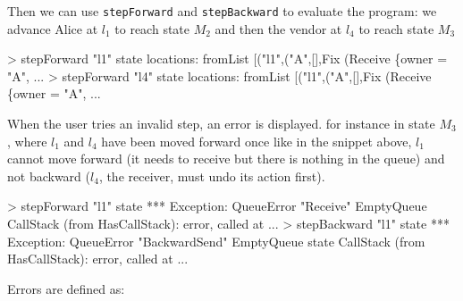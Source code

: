 \documentclass[runningheads,plain]{llncs}
\newenvironment{Shaded}{}{}
\newcommand{\DataTypeTok}[1]{\textcolor[rgb]{0.56,0.13,0.00}{#1}}
\newcommand{\StringTok}[1]{\textcolor[rgb]{0.25,0.44,0.63}{#1}}
\newcommand{\FunctionTok}[1]{\textcolor[rgb]{0.02,0.16,0.49}{#1}}
\newcommand{\NormalTok}[1]{#1}
\begin{document}
Then we can use \texttt{stepForward} and \texttt{stepBackward} to
evaluate the program: we advance Alice at $l_1$ to reach state $M_2$ and then the vendor at $l_4$ to reach state $M_3$

\begin{Shaded}
\begin{Highlighting}[]
\FunctionTok{>}\NormalTok{ stepForward }\StringTok{"l1"}\NormalTok{ state}
\NormalTok{locations}\FunctionTok{:}\NormalTok{ fromList [(}\StringTok{"l1"}\NormalTok{,(}\StringTok{"A"}\NormalTok{,[],}\DataTypeTok{Fix}\NormalTok{ (}\DataTypeTok{Receive}\NormalTok{ \{owner }\FunctionTok{=} \StringTok{"A"}\NormalTok{, }\FunctionTok{...} 
\FunctionTok{>}\NormalTok{ stepForward }\StringTok{"l4"}\NormalTok{ state }
\NormalTok{locations}\FunctionTok{:}\NormalTok{ fromList [(}\StringTok{"l1"}\NormalTok{,(}\StringTok{"A"}\NormalTok{,[],}\DataTypeTok{Fix}\NormalTok{ (}\DataTypeTok{Receive}\NormalTok{ \{owner }\FunctionTok{=} \StringTok{"A"}\NormalTok{, }\FunctionTok{...} 
\end{Highlighting}
\end{Shaded}

When the user tries an invalid step, an error is displayed. for instance
in state $M_3$, where \(l_1\) and \(l_4\) have been moved forward once like in the
snippet above, \(l_1\) cannot move forward (it needs to receive but
there is nothing in the queue) and not backward (\(l_4\), the receiver,
must undo its action first).

\begin{Shaded}
\begin{Highlighting}[]
\FunctionTok{>}\NormalTok{ stepForward }\StringTok{"l1"}\NormalTok{ state}
\FunctionTok{***} \DataTypeTok{Exception}\FunctionTok{:} \DataTypeTok{QueueError} \StringTok{"Receive"} \DataTypeTok{EmptyQueue}
\DataTypeTok{CallStack}\NormalTok{ (from }\DataTypeTok{HasCallStack}\NormalTok{)}\FunctionTok{:}
\NormalTok{  error, called at }\FunctionTok{...} 
\FunctionTok{>}\NormalTok{ stepBackward }\StringTok{"l1"}\NormalTok{ state}
\FunctionTok{***} \DataTypeTok{Exception}\FunctionTok{:} \DataTypeTok{QueueError} \StringTok{"BackwardSend"} \DataTypeTok{EmptyQueue}\NormalTok{ state}
\DataTypeTok{CallStack}\NormalTok{ (from }\DataTypeTok{HasCallStack}\NormalTok{)}\FunctionTok{:}
\NormalTok{  error, called at }\FunctionTok{...} 
\end{Highlighting}
\end{Shaded}

Errors are defined as:
\end{document}
